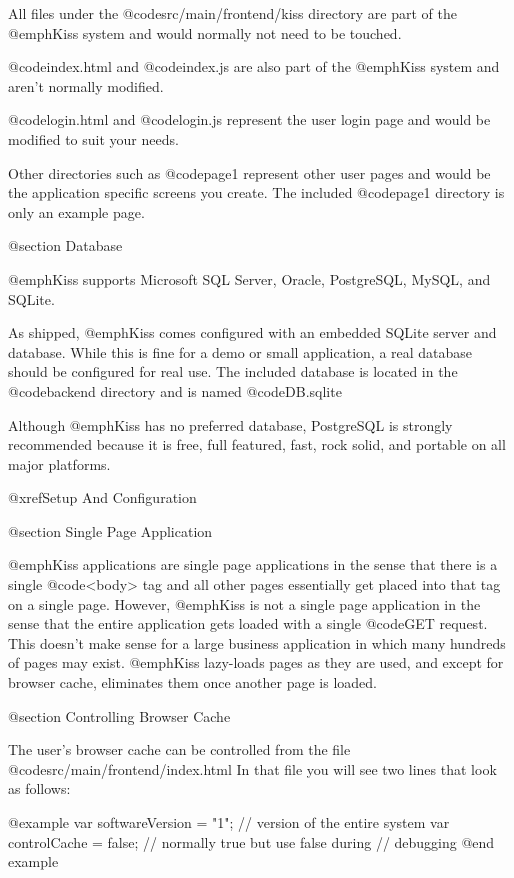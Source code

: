 All files under the @code{src/main/frontend/kiss} directory are part of
the @emph{Kiss} system and would normally not need to be touched.

@code{index.html} and @code{index.js} are also part of the @emph{Kiss}
system and aren't normally modified.

@code{login.html} and @code{login.js} represent the user login page
and would be modified to suit your needs.

Other directories such as @code{page1} represent other user pages and
would be the application specific screens you create.  The included
@code{page1} directory is only an example page.

@section Database

@emph{Kiss} supports Microsoft SQL Server, Oracle, PostgreSQL, MySQL, and
SQLite.

As shipped, @emph{Kiss} comes configured with an embedded SQLite
server and database.  While this is fine for a demo or small
application, a real database should be configured for real use.
The included database is located in the @code{backend} directory
and is named @code{DB.sqlite}

Although @emph{Kiss} has no preferred database, PostgreSQL is strongly
recommended because it is free, full featured, fast, rock solid, and
portable on all major platforms.

@xref{Setup And Configuration}


@section Single Page Application

@emph{Kiss} applications are single page applications in the sense
that there is a single @code{<body>} tag and all other pages
essentially get placed into that tag on a single page.  However,
@emph{Kiss} is not a single page application in the sense that the
entire application gets loaded with a single @code{GET} request.  This
doesn't make sense for a large business application in which many
hundreds of pages may exist.  @emph{Kiss} lazy-loads pages as they are
used, and except for browser cache, eliminates them once another page
is loaded.

@section Controlling Browser Cache

The user's browser cache can be controlled from the file
@code{src/main/frontend/index.html} In that file you will see two lines
that look as follows:

@example
var softwareVersion = "1";  // version of the entire system
var controlCache = false;   // normally true but use false during 
                            // debugging
@end example

